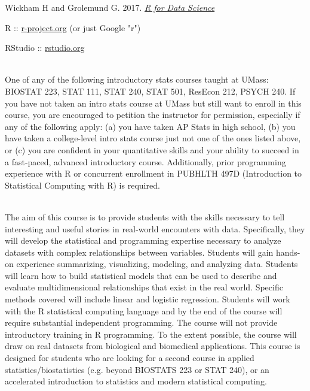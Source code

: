 \documentclass[10pt]{article}
\begin{document}
Wickham H and Grolemund G. 2017. \emph{\href{https://r4ds.had.co.nz/index.html}{R for Data Science}}



R :: \href{http://www.r-project.org}{r-project.org} (or just Google "r")

RStudio :: \href{http://www.rstudio.org}{rstudio.org}


\bigskip
{}\\
One of any of the following introductory stats courses taught at UMass: BIOSTAT 223, STAT 111, STAT 240, STAT 501, ResEcon 212, PSYCH 240. If you have not taken an intro stats course at UMass but still want to enroll in this course, you are encouraged to petition the instructor for permission, especially if any of the following apply: (a) you have taken AP Stats in high school, (b) you have taken a college-level intro stats course just not one of the ones listed above, or (c) you are confident in your quantitative skills and your ability to succeed in a fast-paced, advanced introductory course. Additionally, prior programming experience with R or concurrent enrollment in PUBHLTH 497D (Introduction to Statistical Computing with R) is required.


\bigskip
{}\\
The aim of this course is to provide students with the skills necessary to tell interesting and useful stories in real-world encounters with data. Specifically, they will develop the statistical and programming expertise necessary to analyze datasets with complex relationships between variables. Students will gain hands-on experience summarizing, visualizing, modeling, and analyzing data. Students will learn how to build statistical models that can be used to describe and evaluate multidimensional relationships that exist in the real world. Specific methods covered will include linear and logistic regression. Students will work with the R statistical computing language and by the end of the course will require substantial independent programming. The course will not provide introductory training in R programming. To the extent possible, the course will draw on real datasets from biological and biomedical applications. This course is designed for students who are looking for a second course in applied statistics/biostatistics (e.g. beyond BIOSTATS 223 or STAT 240), or an accelerated introduction to statistics and modern statistical computing.
\end{document}
